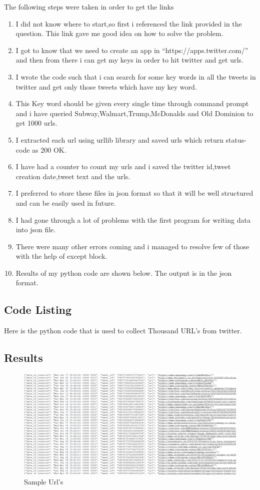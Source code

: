 The following steps were taken in order to get the links 
\begin{enumerate}
\item I did not know where to start,so first i referenced the link provided in the question. This link gave me good idea on how to solve the problem.
\item I got to know that we need to create an app in ``https://apps.twitter.com/'' and then from there i can get my keys in order to hit twitter and get urls.
\item I wrote the code such that i can search for some key words in all the tweets in twitter and get only those tweets which have my key word.
\item This Key word should be given every single time through command prompt and i have queried Subway,Walmart,Trump,McDonalds and Old Dominion to get 1000 urls.
\item I extracted each url using urllib library and saved urls which return status-code as 200 OK.
\item I have had a counter to count my urls and i saved the twitter id,tweet creation date,tweet text and the urls.
\item I preferred to store these files in json format so that it will be well structured and can be easily used in future. 
\item I had gone through a lot of problems with the first program for writing data into json file.
\item There were many other errors coming and i managed to resolve few of those with the help of except block. 
\item Results of my python code are shown below. The output is in the json format. 
\end{enumerate}
\newpage
\subsection{Code Listing}
Here is the python code that is used to collect Thousand URL's from twitter. 



\newpage
\subsection{Results}
\begin{figure}[ht]    
    \begin{center}
        \includegraphics[scale=0.35]{samples_urls.png}
        \caption{Sample Url's}
        \label{Sample Url's}
    \end{center}
\end{figure}


